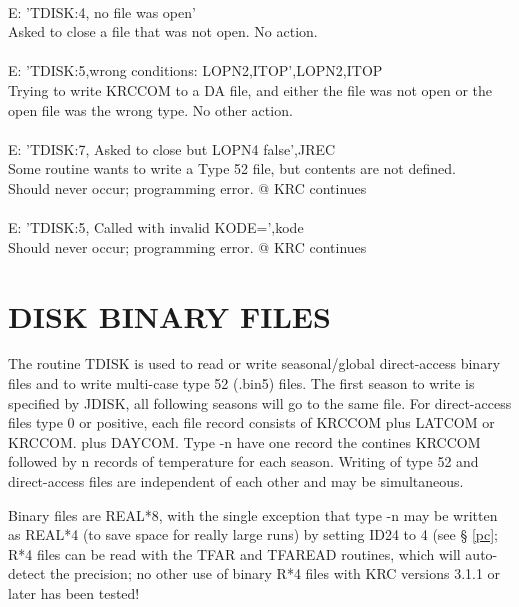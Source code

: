 \documentclass{article}
\newcommand{\qi}{\\ \hspace*{2.em}}      %
\begin{document}
\\ E: 'TDISK:4, no file was open'
\qi Asked to close a file that was not open.   No action.
\\ 
\\ E: 'TDISK:5,wrong conditions: LOPN2,ITOP',LOPN2,ITOP
\qi  Trying to write KRCCOM to a DA file, and either the file was not open or the open file was the wrong type. No other action.
\\   
\\ E: 'TDISK:7, Asked to close but LOPN4 false',JREC
\qi Some routine wants to write a Type 52 file, but contents are not defined.
\qi Should never occur; programming error. @ KRC continues
\\ 
\\ E: 'TDISK:5, Called with invalid KODE=',kode
\qi Should never occur; programming error. @ KRC continues


\section{DISK BINARY FILES \label{dbf} } %

The routine TDISK is used to read or write seasonal/global direct-access binary
files and to write multi-case type 52 (.bin5) files. The first season to write
is specified by JDISK, all following seasons will go to the same file. For
direct-access files type 0 or positive, each file record consists of KRCCOM plus
LATCOM or KRCCOM.  plus DAYCOM. Type -n have one record the contines KRCCOM
followed by n records of temperature for each season. Writing of type 52 and
direct-access files are independent of each other and may be simultaneous.

Binary files are REAL*8, with the single exception that type -n may be written
as REAL*4 (to save space for really large runs) by setting ID24 to 4 (see \S
\ref{pc}; R*4 files can be read with the TFAR and TFAREAD routines, which will
auto-detect the precision; no other use of binary R*4 files with KRC versions
3.1.1 or later has been tested!
\end{document}

